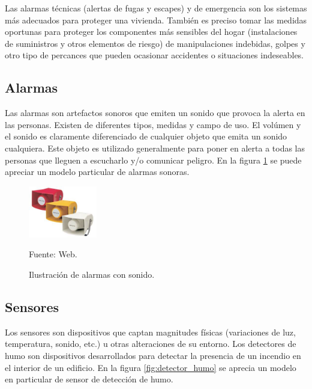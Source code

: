 Las alarmas técnicas (alertas de fugas y escapes) y de emergencia son los sistemas más adecuados para proteger una vivienda. También es preciso tomar las medidas oportunas para proteger los componentes más sensibles del hogar (instalaciones de suministros y otros elementos de riesgo) de manipulaciones indebidas, golpes y otro tipo de percances que pueden ocasionar accidentes o situaciones indeseables.\\

\subsection{Alarmas}

Las alarmas son artefactos sonoros que emiten un sonido que provoca la alerta en las personas. Existen de diferentes tipos, medidas y campo de uso. El volúmen y el sonido es claramente diferenciado de cualquier objeto que emita un sonido cualquiera. Este objeto es utilizado generalmente para poner en alerta a todas las personas que lleguen a escucharlo y/o comunicar peligro.
En la figura \ref{fig:bocinas} se puede apreciar un modelo particular de alarmas sonoras.

\begin{figure}[H]
    \begin{center}
        \includegraphics[width=3cm]{img/capitulo_3/alarmas.jpg}
    \end{center}
    \begin{center}
        \caption{Ilustración de alarmas con sonido.}
        Fuente: Web.
        \label{fig:bocinas}
    \end{center}
\end{figure}

\subsection{Sensores}
Los sensores son dispositivos que captan magnitudes físicas (variaciones de luz, temperatura, sonido, etc.) u otras alteraciones de su entorno. Los detectores de humo son dispositivos desarrollados para detectar la presencia de un incendio en el interior de un edificio. En la figura \ref{fig:detector_humo} se aprecia un modelo en particular de sensor de detección de humo.\\

